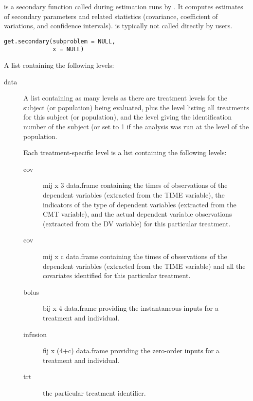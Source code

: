 %
\begin{Description}\relax
{} is a secondary function called during estimation runs by 
. It computes estimates of secondary parameters and related
statistics (covariance, coefficient of variations, and confidence intervals).
 is typically not called directly by users.
\end{Description}
%
\begin{Usage}
\begin{verbatim}
get.secondary(subproblem = NULL,
              x = NULL)
\end{verbatim}
\end{Usage}
%
\begin{Arguments}
\begin{ldescription}
\item[\code{subproblem}] A list containing the following levels:\begin{description}

\item[data] A list containing as many levels as there are treatment levels 
for the subject (or population) being evaluated, plus the  
level listing all treatments for this subject (or population), and the 
 level giving the identification number of the subject (or set to
1 if the analysis was run at the level of the population.

Each treatment-specific level is a list containing the following levels: 
\begin{description}

\item[cov] mij x 3 data.frame containing the times of observations of the
dependent variables (extracted from the TIME variable), the indicators
of the type of dependent variables (extracted from the CMT variable),
and the actual dependent variable observations (extracted from the 
DV variable) for this particular treatment.
\item[cov] mij x c data.frame containing the times of observations of 
the dependent variables (extracted from the TIME variable) and all the
covariates identified for this particular treatment.
\item[bolus] bij x 4 data.frame providing the instantaneous inputs 
for a treatment and individual.
\item[infusion] fij x (4+c) data.frame providing the zero-order inputs for
a treatment and individual.
\item[trt] the particular treatment identifier.
\end{description}



\end{description}
\end{ldescription}
\end{Arguments}
